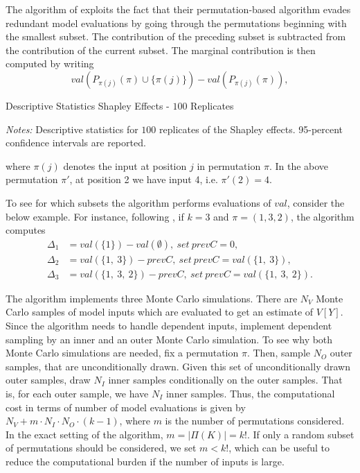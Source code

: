 The algorithm of \citet{SNS16} exploits the fact that their permutation-based algorithm evades redundant model evaluations by going through the permutations beginning with the smallest subset. The contribution of the preceding subset is subtracted from the contribution of the current subset. The marginal contribution is then computed by writing
\begin{equation*}
val(P_{\pi(j)}(\pi) \cup \{\pi(j)\}) - val(P_{\pi(j)}(\pi)),
\end{equation*}

\begin{table}[t]
	\centering
	\caption{Descriptive Statistics Shapley Effects - $100$ Replicates}
	\label{shapley_descriptives}
	\begin{threeparttable}
	\centering
	
	\begin{tablenotes}
	\small
	\item \textit{Notes:} Descriptive statistics for $100$ replicates of the Shapley effects. 95-percent confidence intervals are reported.
	\end{tablenotes}
	\end{threeparttable}
\end{table}

\noindent where $\pi(j)$ denotes the input at position $j$ in permutation $\pi$. In the above permutation $\pi'$, at position 2 we have input 4, i.e. $\pi'(2)=4$.

To see for which subsets the algorithm performs evaluations of $val$, consider the below example. For instance, following \citet{SNS16}, if $k=3$ and $\pi=(1, 3, 2)$, the algorithm computes
\begin{align*}
\Delta_1 &=val(\{1\})-val(\emptyset),\ set\ prevC=0, \\
\Delta_2 &=val(\{1,\ 3\})-prevC,\ set\ prevC=val(\{1,\ 3\}), \\
\Delta_3 &=val(\{1,\ 3,\ 2\})-prevC,\ set\ prevC=val(\{1,\ 3,\ 2\}).
\end{align*}

The algorithm implements three Monte Carlo simulations. There are $N_V$ Monte Carlo samples of model inputs which are evaluated to get an estimate of $V[Y]$. Since the algorithm needs to handle dependent inputs, \citet{SNS16} implement dependent sampling by an inner and an outer Monte Carlo simulation. To see why both Monte Carlo simulations are needed, fix a permutation $\pi$. Then, sample $N_O$ outer samples, that are unconditionally drawn. Given this set of unconditionally drawn outer samples, draw $N_I$ inner samples conditionally on the outer samples. That is, for each outer sample, we have $N_I$ inner samples. Thus, the computational cost in terms of number of model evaluations is given by $N_V+m \cdot N_I \cdot N_O \cdot (k-1)$, where $m$ is the number of permutations considered. In the exact setting of the algorithm, $m=\vert \Pi(K) \vert=k!$. If only a random subset of permutations should be considered, we set $m<k!$, which can be useful to reduce the computational burden if the number of inputs is large.

